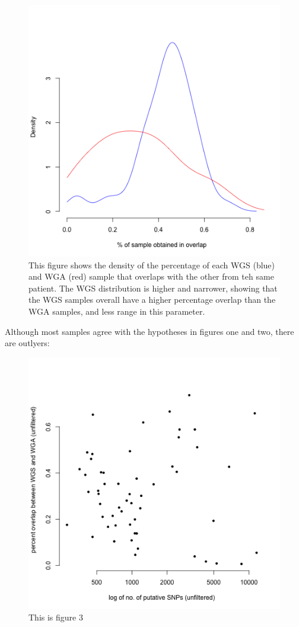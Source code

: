 \documentclass[11pt]{article} %
\begin{document}
\begin{figure}
\includegraphics[scale=0.5]{unfiltered_overlap_WGS_WGA_together_densities.png}
\caption{This figure shows the density of the percentage of each WGS (blue) and WGA (red) sample that overlaps with the other from teh same patient. The WGS distribution is higher and narrower, showing that the WGS samples overall have a higher percentage overlap than the WGA samples, and less range in this parameter. }
\end{figure}

Although most samples agree with the hypotheses in figures one and two, there are outlyers: 

\begin{figure}
\includegraphics[scale=0.5]{unfiltered_total_muts_v_percent_overlap.png}
\caption{This is figure 3}
\end{figure}
\end{document}
